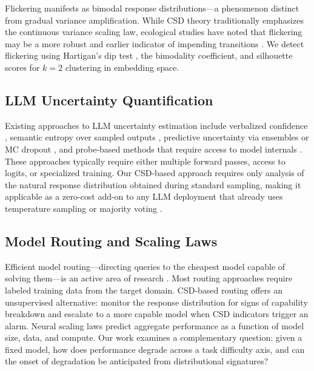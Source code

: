 \documentclass[11pt,letterpaper]{article}
\begin{document}
Flickering manifests as bimodal response distributions---a phenomenon distinct from gradual variance amplification. While CSD theory traditionally emphasizes the continuous variance scaling law, ecological studies have noted that flickering may be a more robust and earlier indicator of impending transitions \citep{Scheffer2012, Dakos2012}. We detect flickering using Hartigan's dip test \citep{Hartigan1985}, the bimodality coefficient, and silhouette scores for $k=2$ clustering in embedding space.

\subsection{LLM Uncertainty Quantification}

Existing approaches to LLM uncertainty estimation include verbalized confidence \citep{Kadavath2022, Xiong2023, Lin2022}, semantic entropy over sampled outputs \citep{Kuhn2023}, predictive uncertainty via ensembles or MC dropout \citep{Lakshminarayanan2017, Gal2016}, and probe-based methods that require access to model internals \citep{Malinin2018}. These approaches typically require either multiple forward passes, access to logits, or specialized training. Our CSD-based approach requires only analysis of the natural response distribution obtained during standard sampling, making it applicable as a zero-cost add-on to any LLM deployment that already uses temperature sampling or majority voting \citep{Wang2022}.

\subsection{Model Routing and Scaling Laws}

Efficient model routing---directing queries to the cheapest model capable of solving them---is an active area of research \citep{Chen2024, Jiang2023}. Most routing approaches require labeled training data from the target domain. CSD-based routing offers an unsupervised alternative: monitor the response distribution for signs of capability breakdown and escalate to a more capable model when CSD indicators trigger an alarm. Neural scaling laws \citep{Kaplan2020} predict aggregate performance as a function of model size, data, and compute. Our work examines a complementary question: given a fixed model, how does performance degrade across a task difficulty axis, and can the onset of degradation be anticipated from distributional signatures?


\end{document}
